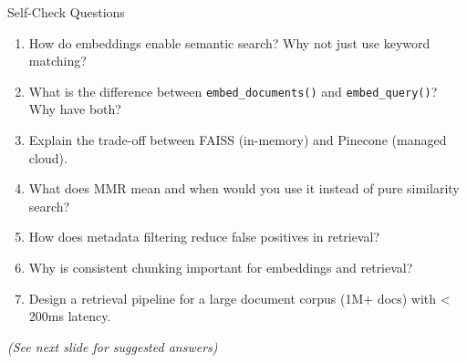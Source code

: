 \documentclass[aspectratio=169,11pt]{beamer}
\begin{document}
\begin{frame}{Self-Check Questions}
  \begin{enumerate}
    \setlength{\itemsep}{0pt}
    \item How do embeddings enable semantic search? Why not just use keyword matching?
    \vspace{0.07cm}
    \item What is the difference between \texttt{embed\_documents()} and \texttt{embed\_query()}? Why have both?
    \vspace{0.07cm}
    \item Explain the trade-off between FAISS (in-memory) and Pinecone (managed cloud).
    \vspace{0.07cm}
    \item What does MMR mean and when would you use it instead of pure similarity search?
    \vspace{0.07cm}
    \item How does metadata filtering reduce false positives in retrieval?
    \vspace{0.07cm}
    \item Why is consistent chunking important for embeddings and retrieval?
    \vspace{0.07cm}
    \item Design a retrieval pipeline for a large document corpus (1M+ docs) with < 200ms latency.
  \end{enumerate}

  \vspace{0.05cm}
  \textit{(See next slide for suggested answers)}
\end{frame}
\end{document}

